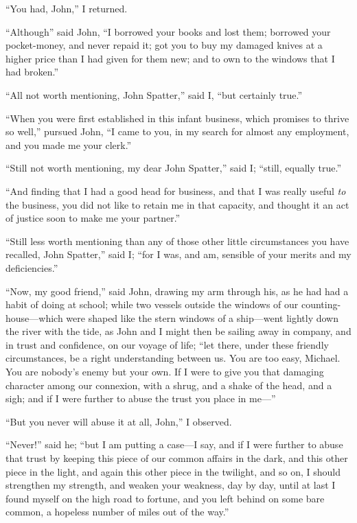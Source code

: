 ``You had, John,'' I returned.

``Although'' said John, ``I borrowed your books and lost them; borrowed
your pocket-money, and never repaid it; got you to buy my damaged
knives at a higher price than I had given for them new; and to own
to the windows that I had broken.''

``All not worth mentioning, John Spatter,'' said I, ``but certainly
true.''

``When you were first established in this infant business, which
promises to thrive so well,'' pursued John, ``I came to you, in my
search for almost any employment, and you made me your clerk.''

``Still not worth mentioning, my dear John Spatter,'' said I; ``still,
equally true.''

``And finding that I had a good head for business, and that I was
really useful \emph{to} the business, you did not like to retain me in that
capacity, and thought it an act of justice soon to make me your
partner.''

``Still less worth mentioning than any of those other little
circumstances you have recalled, John Spatter,'' said I; ``for I was,
and am, sensible of your merits and my deficiencies.''

``Now, my good friend,'' said John, drawing my arm through his, as he
had had a habit of doing at school; while two vessels outside the
windows of our counting-house---which were shaped like the stern
windows of a ship---went lightly down the river with the tide, as
John and I might then be sailing away in company, and in trust and
confidence, on our voyage of life; ``let there, under these friendly
circumstances, be a right understanding between us.  You are too
easy, Michael.  You are nobody's enemy but your own.  If I were to
give you that damaging character among our connexion, with a shrug,
and a shake of the head, and a sigh; and if I were further to abuse
the trust you place in me---''

``But you never will abuse it at all, John,'' I observed.

``Never!'' said he; ``but I am putting a case---I say, and if I were
further to abuse that trust by keeping this piece of our common
affairs in the dark, and this other piece in the light, and again
this other piece in the twilight, and so on, I should strengthen my
strength, and weaken your weakness, day by day, until at last I
found myself on the high road to fortune, and you left behind on
some bare common, a hopeless number of miles out of the way.''

